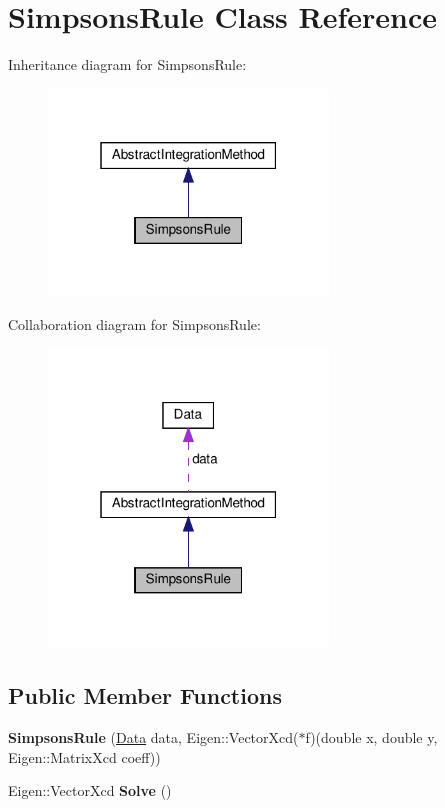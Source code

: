 \hypertarget{classSimpsonsRule}{}\section{Simpsons\+Rule Class Reference}
\label{classSimpsonsRule}


Inheritance diagram for Simpsons\+Rule\+:\nopagebreak
\begin{figure}[H]
\begin{center}
\leavevmode
\includegraphics[width=211pt]{classSimpsonsRule__inherit__graph}
\end{center}
\end{figure}


Collaboration diagram for Simpsons\+Rule\+:\nopagebreak
\begin{figure}[H]
\begin{center}
\leavevmode
\includegraphics[width=211pt]{classSimpsonsRule__coll__graph}
\end{center}
\end{figure}
\subsection*{Public Member Functions}
\begin{DoxyCompactItemize}
\item 
\mbox{\label{classSimpsonsRule_af880433d19d6041cdedb081b542a195b}} 
{\bfseries Simpsons\+Rule} (\hyperlink{structData}{Data} data, Eigen\+::\+Vector\+Xcd($\ast$f)(double x, double y, Eigen\+::\+Matrix\+Xcd coeff))
\item 
\mbox{\label{classSimpsonsRule_a9925b07e44be9fc1644d3cbeb742078c}} 
Eigen\+::\+Vector\+Xcd {\bfseries Solve} ()
\end{DoxyCompactItemize}
